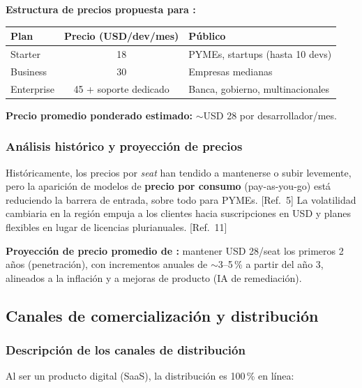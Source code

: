 \noindent\textbf{Estructura de precios propuesta para \NombreProducto:}

\begin{table}[ht]
  \centering
  \begin{tabularx}{\linewidth}{l c Y}
    \toprule
    \textbf{Plan} & \textbf{Precio (USD/dev/mes)} & \textbf{Público} \\
    \midrule
    Starter    & 18 & PYMEs, startups (hasta 10 devs) \\
    Business   & 30 & Empresas medianas \\
    Enterprise & 45 + soporte dedicado & Banca, gobierno, multinacionales \\
    \bottomrule
  \end{tabularx}
\end{table}

\noindent\textbf{Precio promedio ponderado estimado:} $\sim$USD 28 por desarrollador/mes.

\subsubsection{Análisis histórico y proyección de precios}
Históricamente, los precios por \emph{seat} han tendido a mantenerse o subir levemente,
pero la aparición de modelos de \textbf{precio por consumo} (pay-as-you-go) está
reduciendo la barrera de entrada, sobre todo para PYMEs. [Ref.~5] La volatilidad
cambiaria en la región empuja a los clientes hacia suscripciones en USD y planes
flexibles en lugar de licencias plurianuales. [Ref.~11]

\noindent\textbf{Proyección de precio promedio de \NombreProducto:} mantener USD 28/seat
los primeros 2 años (penetración), con incrementos anuales de $\sim$3--5\,\% a partir
del año 3, alineados a la inflación y a mejoras de producto (IA de remediación).

\subsection{Canales de comercialización y distribución}

\subsubsection{Descripción de los canales de distribución}
Al ser un producto digital (SaaS), la distribución es 100\,\% en línea:

